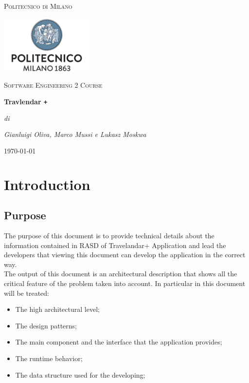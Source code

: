 \documentclass[numbers=noenddot, 12pt, a4paper, oneside]{scrbook}
\def\Plus{\texttt{+}}
\begin{document}
 
\begin{titlepage}
	\centering
	{\scshape\LARGE Politecnico di Milano \par}
	\vspace{1cm}
	\includegraphics[width=0.35\textwidth]{polimi-logo}\par
	\vspace{1cm}
		
	{\scshape\Large Software Engineering 2 Course\par}
	\vspace{1.5cm}
	{\huge\bfseries Travlendar \Plus \par}
	\vspace{6cm}
	{\Large\itshape di\par}
	{\Large\itshape Gianluigi Oliva, Marco Mussi e Lukasz Moskwa\par}
	\vfill

	
	\vfill
	
	{\large \today\par}
\end{titlepage}

\newpage 
\tableofcontents
\newpage 


\chapter{Introduction}



\section{Purpose}

The purpose of this document is to provide technical details about the information contained in
RASD of Travelandar+ Application and lead the developers that viewing this document can develop the application in the correct way.\\

The output of this document is an architectural description that shows all the critical feature of the
problem taken into account.
In particular in this document will be treated:
\begin{itemize}
	\item The high architectural level;
	\item The design patterns;
	\item The main component and the interface that the application provides;
	\item The runtime behavior;
	\item The data structure used for the developing;
\end{itemize}
\end{document}
